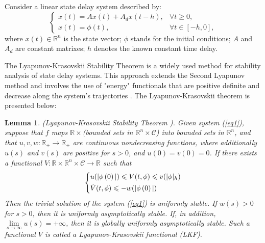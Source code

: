 \documentclass[a4paper]{cas-sc}
\newtheorem{lemma}[theorem]{Lemma}
\begin{document}
Consider a linear state delay system described by:
\begin{equation}
  \left\{ {\begin{array}{*{20}{l}}
        {\dot x(t) = Ax(t) + {A_d}x(t - h),} & {\forall t \geqslant 0,}  \\
        {x(t) = \phi (t),}                   & {\forall t \in [ - h,0],}
      \end{array}} \right.
  \label{eq1}
\end{equation}
where $x(t) \in {\mathbb{R}^n}$ is the state vector; $ \phi $ stands for the initial conditions; $A $ and $A_d $ are constant matrixes; $ h$ denotes the known constant time delay.

The Lyapunov-Krasovskii Stability Theorem is a widely used method for stability analysis of state delay systems. This approach extends the Second Lyapunov method and involves the use of "energy" functionals that are positive definite and decrease along the system's trajectories \citep{Gu2003}. The Lyapunov-Krasovskii theorem is presented below:
\begin{lemma}
  \label{lemma1}
  (Lyapunov-Krasovskii Stability Theorem \citep{Gu2009}). Given system (\ref{eq1}), suppose that $f$ maps $\mathbb{R} \times  $(bounded sets in ${\mathbb{R}^n} \times \mathcal{C} $) into bounded sets in ${\mathbb{R}^n} $, and that $u,v,w:{\mathbb{R}_ + } \to {\mathbb{R}_ + } $ are continuous nondecreasing functions, where additionally $u(s) $ and $v(s) $ are positive for $s > 0 $, and $u(0) = v(0) = 0 $. If there exists a functional $V:\mathbb{R} \times {\mathbb{R}^n} \times \mathcal{C} \to \mathbb{R} $ such that
  \begin{equation}
    \left\{ \begin{gathered}
      u(|\phi \left( 0 \right)|) \leqslant V(t,\phi ) \leqslant v(|\phi {|_h}) \hfill \\
      \dot V(t,\phi ) \leqslant  - w(|\phi \left( 0 \right)|) \hfill \\
    \end{gathered}  \right.
  \end{equation}
  Then the trivial solution of the system (\ref{eq1}) is uniformly stable. If $w(s) > 0 $ for $s > 0 $, then it is uniformly asymptotically stable. If, in addition, $\mathop {\lim }\limits_{s \to \infty } u(s) =  + \infty  $, then it is globally uniformly asymptotically stable. Such a functional $V $ is called a Lyapunov-Krasovskii functional (LKF).
\end{lemma}
\end{document}
